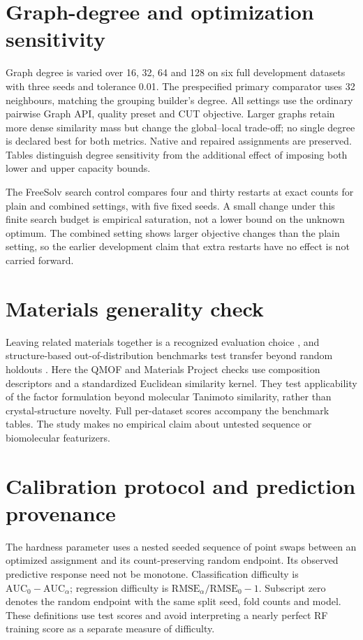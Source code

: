 
\clearpage
\section{Graph-degree and optimization sensitivity}

Graph degree is varied over 16, 32, 64 and 128 on six full development datasets
with three seeds and tolerance 0.01. The prespecified primary comparator uses
32 neighbours, matching the grouping builder's degree. All settings use the
ordinary pairwise Graph API, quality preset and CUT objective. Larger graphs
retain more dense similarity mass but change the global--local trade-off;
no single degree is declared best for both metrics. Native and repaired
assignments are preserved. Tables distinguish degree sensitivity from the
additional effect of imposing both lower and upper capacity bounds.

The FreeSolv search control compares four and thirty restarts at exact counts
for plain and combined settings, with five fixed seeds. A small change under
this finite search budget is empirical saturation, not a lower bound on the
unknown optimum. The combined setting shows larger objective changes than the
plain setting, so the earlier development claim that extra restarts have no
effect is not carried forward.

\clearpage
\section{Materials generality check}

Leaving related materials together is a recognized evaluation choice
\citep{meredig2018,witman2025matfold}, and structure-based out-of-distribution
benchmarks test transfer beyond random holdouts \citep{omee2024}. Here the
QMOF and Materials Project checks use composition descriptors and a standardized
Euclidean similarity kernel. They test applicability of the factor formulation
beyond molecular Tanimoto similarity, rather than crystal-structure novelty.
Full per-dataset scores accompany the benchmark tables. The study makes no
empirical claim about untested sequence or biomolecular featurizers.


\section{Calibration protocol and prediction provenance}

The hardness parameter uses a nested seeded sequence of point swaps between
an optimized assignment and its count-preserving random endpoint. Its observed
predictive response need not be monotone. Classification difficulty is
$\mathrm{AUC}_0-\mathrm{AUC}_\alpha$; regression difficulty is
$\mathrm{RMSE}_\alpha/\mathrm{RMSE}_0-1$. Subscript zero denotes the random
endpoint with the same split seed, fold counts and model. These definitions use
test scores and avoid interpreting a nearly perfect RF training score as a
separate measure of difficulty.

